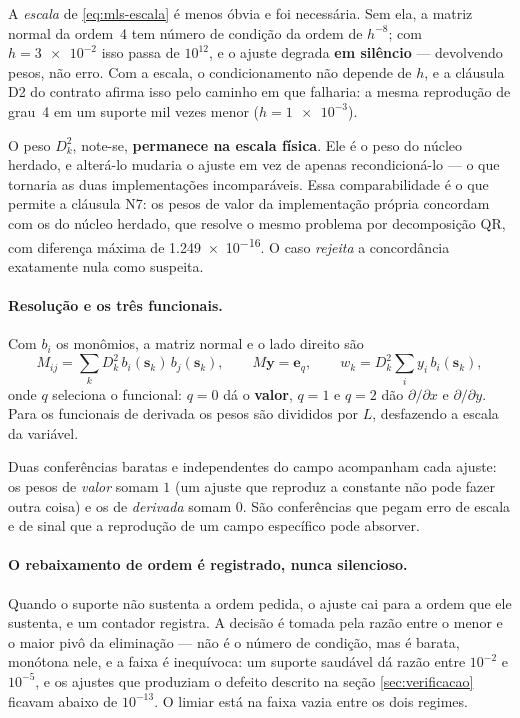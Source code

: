 A \emph{escala} de \eqref{eq:mls-escala} é menos óbvia e foi necessária. Sem ela,
a matriz normal da ordem~4 tem número de condição da ordem de $h^{-8}$; com
$h=\num{3e-2}$ isso passa de $10^{12}$, e o ajuste degrada \textbf{em silêncio}
--- devolvendo pesos, não erro. Com a escala, o condicionamento não depende de
$h$, e a cláusula D2 do contrato afirma isso pelo caminho em que falharia: a
mesma reprodução de grau~4 em um suporte mil vezes menor ($h=\num{1e-3}$).

O peso $D_k^2$, note-se, \textbf{permanece na escala física}. Ele é o peso do
núcleo herdado, e alterá-lo mudaria o ajuste em vez de apenas recondicioná-lo ---
o que tornaria as duas implementações incomparáveis. Essa comparabilidade é o que
permite a cláusula N7: os pesos de valor da implementação própria concordam com
os do núcleo herdado, que resolve o mesmo problema por decomposição QR, com
diferença máxima de \num{1.249e-16}. O caso \emph{rejeita} a concordância
exatamente nula como suspeita.

\paragraph{Resolução e os três funcionais.} Com $b_i$ os monômios, a matriz
normal e o lado direito são
\begin{equation}
  M_{ij} = \sum_k D_k^2\, b_i(\mathbf{s}_k)\, b_j(\mathbf{s}_k),
  \qquad
  M\mathbf{y} = \mathbf{e}_q,
  \qquad
  w_k = D_k^2 \sum_i y_i\, b_i(\mathbf{s}_k),
  \label{eq:mls-normal}
\end{equation}
onde $q$ seleciona o funcional: $q=0$ dá o \textbf{valor}, $q=1$ e $q=2$ dão
$\partial/\partial x$ e $\partial/\partial y$. Para os funcionais de derivada os
pesos são divididos por $L$, desfazendo a escala da variável.

Duas conferências baratas e independentes do campo acompanham cada ajuste: os
pesos de \emph{valor} somam $1$ (um ajuste que reproduz a constante não pode
fazer outra coisa) e os de \emph{derivada} somam $0$. São conferências que pegam
erro de escala e de sinal que a reprodução de um campo específico pode absorver.

\paragraph{O rebaixamento de ordem é registrado, nunca silencioso.} Quando o
suporte não sustenta a ordem pedida, o ajuste cai para a ordem que ele sustenta,
e um contador registra. A decisão é tomada pela razão entre o menor e o maior
pivô da eliminação --- não é o número de condição, mas é barata, monótona nele, e
a faixa é inequívoca: um suporte saudável dá razão entre $10^{-2}$ e $10^{-5}$, e
os ajustes que produziam o defeito descrito na seção \ref{sec:verificacao} ficavam
abaixo de $10^{-13}$. O limiar está na faixa vazia entre os dois regimes.

